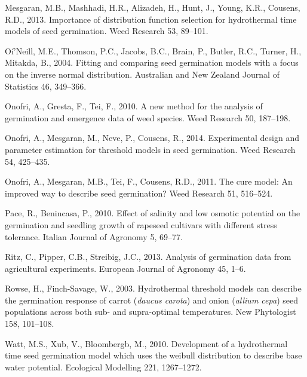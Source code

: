 \documentclass[a4paper,12pt]{article}
\begin{document}
\hypertarget{ref-Mesgaran2013_SeedGermDistributions}{}
Mesgaran, M.B., Mashhadi, H.R., Alizadeh, H., Hunt, J., Young, K.R.,
Cousens, R.D., 2013. Importance of distribution function selection for
hydrothermal time models of seed germination. Weed Research 53, 89--101.

\hypertarget{ref-ONeill2004_FittingComparingSeedGerminationModels}{}
Oí'Neill, M.E., Thomson, P.C., Jacobs, B.C., Brain, P., Butler, R.C.,
Turner, H., Mitakda, B., 2004. Fitting and comparing seed germination
models with a focus on the inverse normal distribution. Australian and
New Zealand Journal of Statistics 46, 349--366.

\hypertarget{ref-OnofriEtAl2010_Survival}{}
Onofri, A., Gresta, F., Tei, F., 2010. A new method for the analysis of
germination and emergence data of weed species. Weed Research 50,
187--198.

\hypertarget{ref-onofri_experimental_2014}{}
Onofri, A., Mesgaran, M., Neve, P., Cousens, R., 2014. Experimental
design and parameter estimation for threshold models in seed
germination. Weed Research 54, 425--435.

\hypertarget{ref-OnofriEtAl2011_CureModel}{}
Onofri, A., Mesgaran, M.B., Tei, F., Cousens, R.D., 2011. The cure
model: An improved way to describe seed germination? Weed Research 51,
516--524.

\hypertarget{ref-PaceIJA_2010}{}
Pace, R., Benincasa, P., 2010. Effect of salinity and low osmotic
potential on the germination and seedling growth of rapeseed cultivars
with different stress tolerance. Italian Journal of Agronomy 5, 69--77.

\hypertarget{ref-Ritz2012_CureModel}{}
Ritz, C., Pipper, C.B., Streibig, J.C., 2013. Analysis of germination
data from agricultural experiments. European Journal of Agronomy 45,
1--6.

\hypertarget{ref-Rowse2003_Hydrotime}{}
Rowse, H., Finch-Savage, W., 2003. Hydrothermal threshold models can
describe the germination response of carrot (\emph{daucus carota}) and
onion (\emph{allium cepa}) seed populations across both sub- and
supra-optimal temperatures. New Phytologist 158, 101--108.

\hypertarget{ref-Watt2010_Hydrotime}{}
Watt, M.S., Xub, V., Bloombergb, M., 2010. Development of a hydrothermal
time seed germination model which uses the weibull distribution to
describe base water potential. Ecological Modelling 221, 1267--1272.
\end{document}
